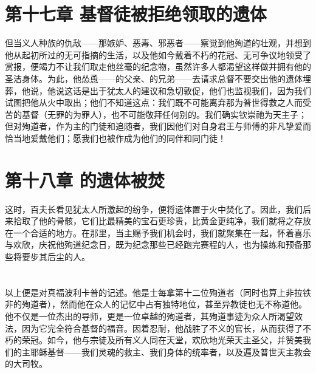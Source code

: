 
\section{第十七章 基督徒被拒绝领取的遗体}

但当义人种族的仇敌——那嫉妒、恶毒、邪恶者——察觉到他殉道的壮观，并想到他从起初所过的无可指摘的生活，以及他如今戴着不朽的花冠、无可争议地领受了赏报，便竭力不让我们取走他丝毫的纪念物，虽然许多人都渴望这样做并拥有他的圣洁身体。为此，他怂恿——的父亲、的兄弟——去请求总督不要交出他的遗体埋葬，他说，他说这话是出于犹太人的建议和急切敦促，他们也监视我们，因为我们试图把他从火中取出；他们不知道这点：我们既不可能离弃那为普世得救之人而受苦的基督（无罪的为罪人），也不可能敬拜任何别的。我们确实钦崇祂为天主子；但对殉道者，作为主的门徒和追随者，我们因他们对自身君王与师傅的非凡挚爱而恰当地爱戴他们；愿我们也被作成为他们的同伴和同门徒！\par


\section{第十八章 的遗体被焚}

这时，百夫长看见犹太人所激起的纷争，便将遗体置于火中焚化了。因此，我们后来拾取了他的骨骸，它们比最精美的宝石更珍贵，比黄金更纯净，我们就将之存放在一个合适的地方。在那里，当主赐予我们机会时，我们就聚集在一起，怀着喜乐与欢欣，庆祝他殉道纪念日，既为纪念那些已经跑完赛程的人，也为操练和预备那些将要步其后尘的人。\par


\section{}

以上便是对真福波利卡普的记述。他是士每拿第十二位殉道者（同时也算上非拉铁非的殉道者），然而他在众人的记忆中占有独特地位，甚至异教徒也无不称道他。他不仅是一位杰出的导师，更是一位卓越的殉道者，其殉道事迹为众人所渴望效法，因为它完全符合基督的福音。因着忍耐，他战胜了不义的官长，从而获得了不朽的荣冠。如今，他与宗徒及所有义人同在天堂，欢欣地光荣天主圣父，并赞美我们的主耶稣基督——我们灵魂的救主、我们身体的统率者，以及遍及普世天主教会的大司牧。\par

